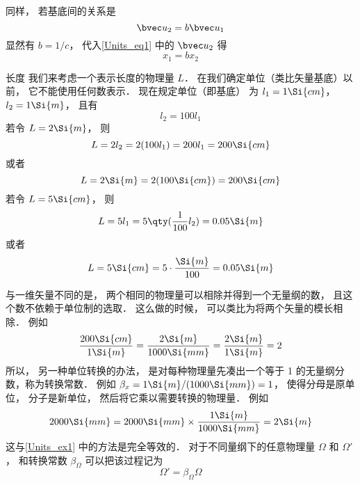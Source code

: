 同样， 若基底间的关系是
\begin{equation}
\bvec u_2 = b\bvec u_1
\end{equation}
显然有 $b = 1/c$， 代入\autoref{Units_eq1} 中的 $\bvec u_2$ 得
\begin{equation}
x_1 = b x_2
\end{equation}

\begin{example}{长度}\label{Units_ex1}
我们来考虑一个表示长度的物理量 $L$． 在我们确定单位（类比矢量基底）以前， 它不能使用任何数表示． 现在规定单位（即基底） 为 $l_1 = 1\Si{cm}$， $l_2 = 1\Si{m}$， 且有
\begin{equation}
l_2 = 100 l_1
\end{equation}
若令 $L = 2\Si{m}$， 则
\begin{equation}
L = 2 l_2 = 2 (100 l_1) = 200 l_1 = 200 \Si{cm}
\end{equation}
或者
\begin{equation}
L = 2 \Si{m} = 2 (100 \Si{cm}) = 200 \Si{cm}
\end{equation}
若令 $L = 5\Si{cm}$， 则
\begin{equation}
L = 5 l_1 = 5 \qty(\frac{1}{100} l_2) = 0.05 \Si{m}
\end{equation}
或者
\begin{equation}
L = 5 \Si{cm} = 5 \cdot \frac{\Si{m}}{100} = 0.05 \Si{m}
\end{equation}
\end{example}

与一维矢量不同的是， 两个相同的物理量可以相除并得到一个无量纲的数， 且这个数不依赖于单位制的选取． 这么做的时候， 可以类比为将两个矢量的模长相除． 例如
\begin{equation}
\frac{200\Si{cm}}{1\Si{m}} = \frac{2\Si{m}}{1000\Si{mm}} = \frac{2\Si{m}}{1\Si{m}} = 2
\end{equation}
所以， 另一种单位转换的办法， 是对每种物理量先凑出一个等于 1 的无量纲分数，称为转换常数． 例如 $\beta_x = 1\Si{m}/(1000\Si{mm}) = 1$， 使得分母是原单位， 分子是新单位， 然后将它乘以需要转换的物理量． 例如
\begin{equation}
2000\Si{mm} = 2000\Si{mm} \times \frac{1\Si{m}}{1000\Si{mm}} = 2\Si{m}
\end{equation}
这与\autoref{Units_ex1} 中的方法是完全等效的． 对于不同量纲下的任意物理量 $\Omega$ 和 $\Omega'$， 和转换常数 $\beta_\Omega$ 可以把该过程记为
\begin{equation}
\Omega' = \beta_\Omega \Omega
\end{equation}

